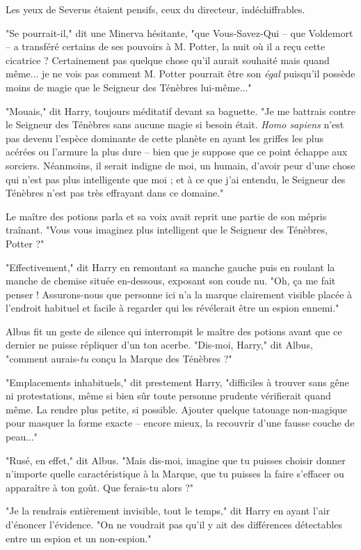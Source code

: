 Les yeux de Severus étaient pensifs, ceux du directeur, indéchiffrables.

"Se pourrait-il," dit une Minerva hésitante, "que Vous-Savez-Qui – que Voldemort – a transféré certains de ses pouvoirs à M. Potter, la nuit où il a reçu cette cicatrice ? Certainement pas quelque chose qu'il aurait souhaité mais quand même... je ne vois pas comment M. Potter pourrait être son \emph{égal}  puisqu'il possède moins de magie que le Seigneur des Ténèbres lui-même..."

"Mouais," dit Harry, toujours méditatif devant sa baguette. "Je me battrais contre le Seigneur des Ténèbres sans aucune magie si besoin était. \emph{Homo sapiens}  n'est pas devenu l'espèce dominante de cette planète en ayant les griffes les plus acérées ou l'armure la plus dure – bien que je suppose que ce point échappe aux sorciers. Néanmoins, il serait indigne de moi, un humain, d'avoir peur d'une chose qui n'est pas plus intelligente que moi ; et à ce que j'ai entendu, le Seigneur des Ténèbres n'est pas très effrayant dans ce domaine."

Le maître des potions parla et sa voix avait reprit une partie de son mépris traînant. "Vous vous imaginez plus intelligent que le Seigneur des Ténèbres, Potter ?"

"Effectivement," dit Harry en remontant sa manche gauche puis en roulant la manche de chemise située en-dessous, exposant son coude nu. "Oh, ça me fait penser ! Assurons-nous que personne ici n'a la marque clairement visible placée à l'endroit habituel et facile à regarder qui les révélerait être un espion ennemi."

Albus fit un geste de silence qui interrompit le maître des potions avant que ce dernier ne puisse répliquer d'un ton acerbe. "Dis-moi, Harry," dit Albus, "comment aurais-\emph{tu}  conçu la Marque des Ténèbres ?"

"Emplacements inhabituels," dit prestement Harry, "difficiles à trouver sans gêne ni protestations, même si bien sûr toute personne prudente vérifierait quand même. La rendre plus petite, si possible. Ajouter quelque tatouage non-magique pour masquer la forme exacte – encore mieux, la recouvrir d'une fausse couche de peau..."

"Rusé, en effet," dit Albus. "Mais dis-moi, imagine que tu puisses choisir donner n'importe quelle caractéristique à la Marque, que tu puisses la faire s'effacer ou apparaître à ton goût. Que ferais-tu alors ?"

"Je la rendrais entièrement invisible, tout le temps," dit Harry en ayant l'air d'énoncer l'évidence. "On ne voudrait pas qu'il y ait des différences détectables entre un espion et un non-espion."

